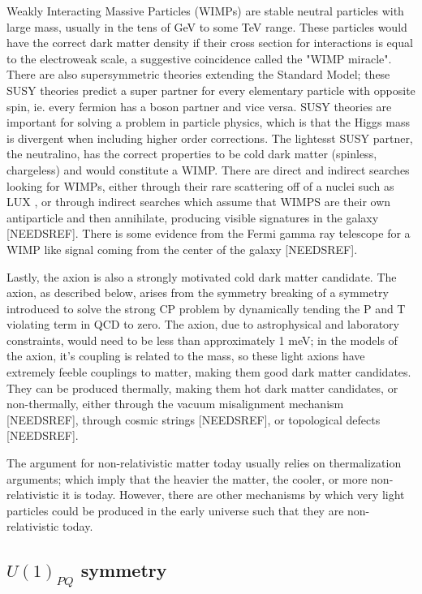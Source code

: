 \documentclass[12pt, twosides]{book}
\begin{document}
Weakly Interacting Massive Particles (WIMPs) are stable neutral particles with large mass, usually in the tens of GeV to some TeV range. These particles would have the correct dark matter density if their cross section for interactions is equal to the electroweak scale, a suggestive coincidence called the "WIMP miracle". There are also supersymmetric theories extending the Standard Model; these SUSY theories predict a super partner for every elementary particle with opposite spin, ie. every fermion has a boson partner and vice versa. SUSY theories are important for solving a problem in particle physics, which is that the Higgs mass is divergent when including higher order corrections. The lightesst SUSY partner, the neutralino, has the correct properties to be cold dark matter (spinless, chargeless) and would constitute a WIMP. There are direct and indirect searches looking for WIMPs, either through their rare scattering off of a nuclei such as LUX \cite{lux14}, or through indirect searches which assume that WIMPS are their own antiparticle and then annihilate, producing visible signatures in the galaxy [NEEDSREF]. There is some evidence from the Fermi gamma ray telescope for a WIMP like signal coming from the center of the galaxy [NEEDSREF].

Lastly, the axion is also a strongly motivated cold dark matter candidate. The axion, as described below, arises from the symmetry breaking of a symmetry introduced to solve the strong CP problem by dynamically tending the P and T violating term in QCD to zero. The axion, due to astrophysical and laboratory constraints, would need to be less than approximately 1 meV; in the models of the axion, it's coupling is related to the mass, so these light axions have extremely feeble couplings to matter, making them good dark matter candidates. They can be produced thermally, making them hot dark matter candidates, or non-thermally, either through the vacuum misalignment mechanism [NEEDSREF], through cosmic strings [NEEDSREF], or topological defects [NEEDSREF].

The argument for non-relativistic matter today usually relies on thermalization arguments; which imply that the heavier the matter, the cooler, or more non-relativistic it is today. However, there are other mechanisms by which very light particles could be produced in the early universe such that they are non-relativistic today.

\subsection{$U(1)_{PQ}$ symmetry}
\end{document}
